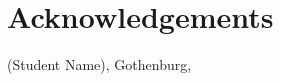 \thispagestyle{plain}			%
\section*{Acknowledgements}


\vspace{1.5cm}
\hfill
(Student Name), Gothenburg, \monthname \space \the\year

\newpage				%
\thispagestyle{empty}
\mbox{}